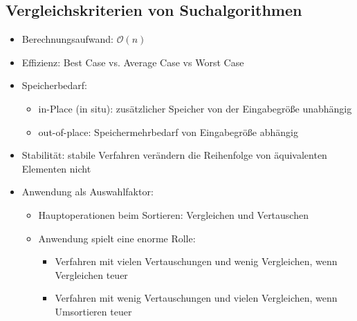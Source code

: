 \documentclass[
    ngerman,
    color=3b,
    load_common, %
    summary,
    boxarc,
]{tuda_summary}
\begin{document}
\subsection{Vergleichskriterien von Suchalgorithmen}\label{Vergleichskriterien von Suchalgorithmen}
\begin{itemize}
    \item Berechnungsaufwand: $\mathcal{O}(n)$
    \item Effizienz: Best Case vs. Average Case vs Worst Case
    \item Speicherbedarf:\begin{itemize}
              \item in-Place (in situ): zusätzlicher Speicher von der Eingabegröße unabhängig
              \item out-of-place: Speichermehrbedarf von Eingabegröße abhängig
          \end{itemize}
    \item Stabilität: stabile Verfahren verändern die Reihenfolge von äquivalenten Elementen nicht
    \item Anwendung als Auswahlfaktor:\begin{itemize}
              \item Hauptoperationen beim Sortieren: Vergleichen und Vertauschen
              \item Anwendung spielt eine enorme Rolle:\begin{itemize}
                        \item Verfahren mit vielen Vertauschungen und wenig Vergleichen, wenn Vergleichen teuer
                        \item Verfahren mit wenig Vertauschungen und vielen Vergleichen, wenn Umsortieren teuer
                    \end{itemize}
          \end{itemize}
\end{itemize}
\end{document}
